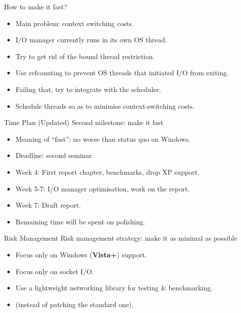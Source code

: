 \documentclass{beamer}
\begin{document}
\begin{frame}{How to make it fast?}
  \begin{itemize}
    \item Main problem: context switching costs.
    \item I/O manager currently runs in its own OS thread.
    \item Try to get rid of the bound thread restriction.
    \item Use refcounting to prevent OS threads that initiated I/O from exiting.
    \item Failing that, try to integrate with the scheduler.
    \item Schedule threads so as to minimise context-switching costs.
  \end{itemize}
\end{frame}

\begin{frame}{Time Plan (Updated)}
  Second milestone: make it fast
  \begin{itemize}
    \item Meaning of ``fast'': no worse than status quo on Windows.
    \item Deadline: second seminar.
    \item Week 4: First report chapter, benchmarks, drop XP support.
    \item Week 5-7: I/O manager optimisation, work on the report.
    \item Week 7: Draft report.
    \item Remaining time will be spent on polishing.
  \end{itemize}
\end{frame}

\begin{frame}{Risk Management}
  Risk management strategy: make it as minimal as possible
  \begin{itemize}
    \item Focus only on Windows (\textbf{Vista+}) support.
    \item Focus only on socket I/O.
    \item Use a lightweight networking library for testing \& benchmarking.
    \item (instead of patching the standard one).
  \end{itemize}

\end{frame}
\end{document}
